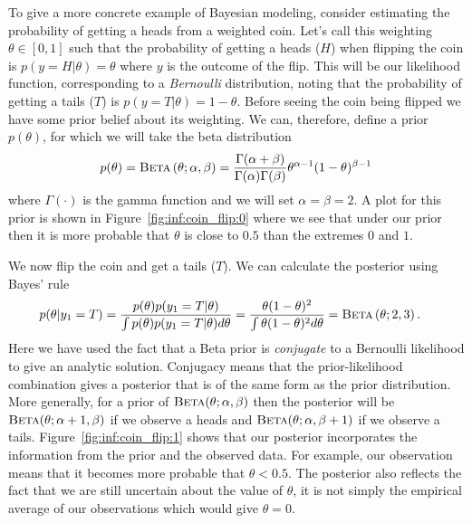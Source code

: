 To give a more concrete example of Bayesian modeling, consider estimating
the probability of getting a heads from a weighted coin.  Let's call this weighting $\theta \in [0,1]$ such
that the probability of getting a heads  ($H$)  when flipping the coin is $p(y=H | \theta)=\theta$
where $y$ is the outcome of the flip.  This will be our likelihood function, corresponding to a
\emph{Bernoulli} distribution, noting that the probability
of getting a tails ($T$) is $p(y = T | \theta) = 1-\theta$.
Before seeing the coin being flipped we have some prior belief about its weighting.  We
can, therefore, define a prior $p(\theta)$, for which we will take the beta distribution
\begin{align}
\label{eq:bayes:beta}
p(\theta) = \textsc{Beta}\left(\theta ; \alpha,\beta\right) = \frac{\Gamma(\alpha+\beta)}{\Gamma (\alpha) \Gamma(\beta)}
\theta^{\alpha-1} (1-\theta)^{\beta-1}
\end{align}
where $\Gamma(\cdot)$ is the gamma function and we will set $\alpha=\beta=2$.  
A plot for this prior is shown in Figure~\ref{fig:inf:coin_flip:0}
where we see that under our prior then it is more probable that $\theta$ is close to $0.5$ than the
extremes $0$ and $1$.  

We now flip the coin and get a tails ($T$).  We can calculate the posterior using Bayes' rule
\begin{align}
p(\theta | y_1 = T) &= \frac{p(\theta) p(y_1=T | \theta)}{\int p(\theta) p(y_1=T | \theta) d\theta} = \frac{\theta (1-\theta)^2}{\int \theta (1-\theta)^2 d\theta} = \textsc{Beta}\left(\theta ; 2,3\right) \label{eq:prob:beta_post_1}.
\end{align}
Here we have used the fact that a Beta prior is \emph{conjugate} to a Bernoulli likelihood
to give an analytic solution.  Conjugacy means that the prior-likelihood combination gives
a posterior that is of the same form as the prior distribution.  More generally, for a prior of
$\textsc{Beta}(\theta ; \alpha, \beta)$ then the posterior will be $\textsc{Beta}(\theta ; \alpha+1, \beta)$
if we observe a heads and $\textsc{Beta}(\theta ; \alpha, \beta+1)$ if we observe a tails.
Figure~\ref{fig:inf:coin_flip:1} shows that our
posterior incorporates the information from the prior and the observed data.  For example, our observation means that it becomes more probable that $\theta<0.5$.  The posterior
also reflects the fact that we are still uncertain about the value of $\theta$, it is not simply the
empirical average of our observations which would give $\theta=0$.

